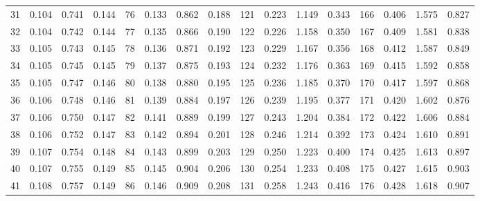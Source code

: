 \begin{table}
{\begin{tabular}{rrrr|rrrr|rrrr|crrr}
 31 & \tiny{  0.104} &   0.741 & \tiny{  0.144} &  76 & \tiny{  0.133} &   0.862 & \tiny{  0.188} & 121 & \tiny{  0.223} &   1.149 & \tiny{  0.343} & 166 & \tiny{  0.406} &   1.575 & \tiny{  0.827}\\
 32 & \tiny{  0.104} &   0.742 & \tiny{  0.144} &  77 & \tiny{  0.135} &   0.866 & \tiny{  0.190} & 122 & \tiny{  0.226} &   1.158 & \tiny{  0.350} & 167 & \tiny{  0.409} &   1.581 & \tiny{  0.838}\\
 33 & \tiny{  0.105} &   0.743 & \tiny{  0.145} &  78 & \tiny{  0.136} &   0.871 & \tiny{  0.192} & 123 & \tiny{  0.229} &   1.167 & \tiny{  0.356} & 168 & \tiny{  0.412} &   1.587 & \tiny{  0.849}\\
 34 & \tiny{  0.105} &   0.745 & \tiny{  0.145} &  79 & \tiny{  0.137} &   0.875 & \tiny{  0.193} & 124 & \tiny{  0.232} &   1.176 & \tiny{  0.363} & 169 & \tiny{  0.415} &   1.592 & \tiny{  0.858}\\
 35 & \tiny{  0.105} &   0.747 & \tiny{  0.146} &  80 & \tiny{  0.138} &   0.880 & \tiny{  0.195} & 125 & \tiny{  0.236} &   1.185 & \tiny{  0.370} & 170 & \tiny{  0.417} &   1.597 & \tiny{  0.868}\\
 36 & \tiny{  0.106} &   0.748 & \tiny{  0.146} &  81 & \tiny{  0.139} &   0.884 & \tiny{  0.197} & 126 & \tiny{  0.239} &   1.195 & \tiny{  0.377} & 171 & \tiny{  0.420} &   1.602 & \tiny{  0.876}\\
 37 & \tiny{  0.106} &   0.750 & \tiny{  0.147} &  82 & \tiny{  0.141} &   0.889 & \tiny{  0.199} & 127 & \tiny{  0.243} &   1.204 & \tiny{  0.384} & 172 & \tiny{  0.422} &   1.606 & \tiny{  0.884}\\
 38 & \tiny{  0.106} &   0.752 & \tiny{  0.147} &  83 & \tiny{  0.142} &   0.894 & \tiny{  0.201} & 128 & \tiny{  0.246} &   1.214 & \tiny{  0.392} & 173 & \tiny{  0.424} &   1.610 & \tiny{  0.891}\\
 39 & \tiny{  0.107} &   0.754 & \tiny{  0.148} &  84 & \tiny{  0.143} &   0.899 & \tiny{  0.203} & 129 & \tiny{  0.250} &   1.223 & \tiny{  0.400} & 174 & \tiny{  0.425} &   1.613 & \tiny{  0.897}\\
 40 & \tiny{  0.107} &   0.755 & \tiny{  0.149} &  85 & \tiny{  0.145} &   0.904 & \tiny{  0.206} & 130 & \tiny{  0.254} &   1.233 & \tiny{  0.408} & 175 & \tiny{  0.427} &   1.615 & \tiny{  0.903}\\
 41 & \tiny{  0.108} &   0.757 & \tiny{  0.149} &  86 & \tiny{  0.146} &   0.909 & \tiny{  0.208} & 131 & \tiny{  0.258} &   1.243 & \tiny{  0.416} & 176 & \tiny{  0.428} &   1.618 & \tiny{  0.907}\\

\end{tabular}}
\end{table}
